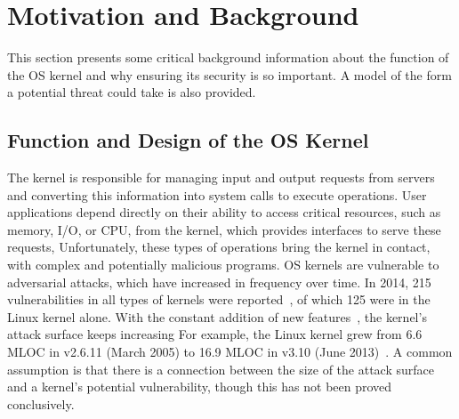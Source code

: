 \section{Motivation and Background}
\label{sec.motivation-and-background}

This section presents some critical background information
about the function of the OS kernel and why ensuring its security is so important.
A model of the form a potential threat could take is also provided.

\subsection{Function and Design of the OS Kernel}

The kernel is responsible for
managing input and output requests from servers and converting this information
into system calls to execute operations. User applications depend directly on
their ability to access critical resources, such as memory, I/O, or CPU, from the
kernel, which provides interfaces to serve these requests, Unfortunately, these
types of operations bring the kernel in contact, with complex and potentially
malicious programs. OS kernels are vulnerable to adversarial attacks, which have
increased in frequency over time.
In 2014, 215 vulnerabilities in all types of kernels were reported~\cite{NVD},
of which 125 were in the Linux kernel alone.
With the constant addition of new features~\cite{Metrics-13}, the kernel's
attack surface keeps increasing For example, the Linux kernel grew from 6.6 MLOC
in v2.6.11 (March 2005) to 16.9 MLOC in v3.10 (June 2013)~\cite{Linux-13}. A
common assumption is that there is a connection between the size of the attack
surface and a kernel's potential vulnerability, though this has not been proved
conclusively.


